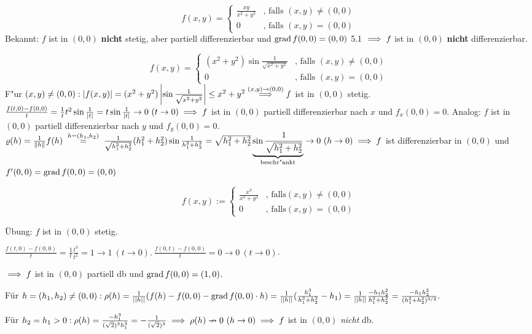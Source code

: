 \documentclass[a4paper,twoside,DIV15,BCOR12mm]{scrbook}
\begin{document}
\begin{beispiele}
\item $$f(x,y)=\begin{cases}
\frac{xy}{x^2+y^2}&\text{, falls } (x,y)\ne(0,0)\\
0&\text{, falls } (x,y)=(0,0)
\end{cases}$$
Bekannt: $f$ ist in $(0,0)$ \textbf{nicht} stetig, aber partiell differenzierbar und $\mathop{\rm grad}\nolimits f(0,0)=(0,0)$ 5.1 $\implies f$ ist in $(0,0)$ \textbf{nicht} differenzierbar.
\item $$f(x,y)=\begin{cases}
(x^2+y^2)\sin\frac{1}{\sqrt{x^2+y^2}}&\text{, falls } (x,y)\ne(0,0)\\
0&\text{, falls }(x,y)=(0,0)
\end{cases}$$
F"ur $(x,y)\ne(0,0): \left|f(x,y)\right|=(x^2+y^2)\left|\sin\frac{1}{\sqrt{x^2+y^2}}\right|\le x^2+y^2\overset{(x,y)\to(0,0)}{\implies}f$ ist in $(0,0)$ stetig. $\frac{f(t,0)-f(0,0)}{t}=\frac{1}{t}t^2\sin\frac{1}{|t|}=t\sin\frac{1}{|t|}\to 0\ (t\to 0)\implies f$ ist in $(0,0)$ partiell differenzierbar nach $x$ und $f_x(0,0)=0$. Analog: $f$ ist in $(0,0)$ partiell differenzierbar nach $y$ und $f_y(0,0)=0$. $\varrho(h)=\frac{1}{\|h\|}f(h)\gleichwegen{h=(h_1,h_2)}\frac{1}{\sqrt{h_1^2+h_2^2}}(h_1^2+h_2^2)\sin\frac{1}{h_1^2+h_2^2}=\sqrt{h_1^2+h_2^2}\underbrace{\sin\frac{1}{\sqrt{h_1^2+h_2^2}}}_{\text{beschr"ankt}}\to 0\ (h\to 0)\folgt f$ ist differenzierbar in $(0,0)$ und $f'(0,0)=\mathop{\rm grad}\nolimits f(0,0)=(0,0)$

\item $$f(x,y) := \begin{cases}
\frac{x^3}{x^2+y^2}&\text{, falls} (x,y) \ne (0,0)\\
0&\text{, falls} (x,y) = (0,0)\end{cases}$$

\"Ubung: $f$ ist in $(0,0)$ stetig.

$\frac{f(t,0) - f(0,0)}{t} = \frac{1}{t} \frac{t^3}{t^2} = 1 \to 1\ (t \to 0).\ \frac{f(0,t) - f(0,0)}{t} = 0 \to 0\ (t \to 0)$.

$\implies f$ ist in $(0,0)$ partiell db und $\mathop{\rm grad}\nolimits f(0,0) = (1,0)$.

Für $h = (h_1,h_2) \ne (0,0): \rho(h) = \frac{1}{||h||}(f(h) - f(0,0) - \mathop{\rm grad}\nolimits f(0,0)\cdot h) = \frac{1}{||h||} (\frac{h_1^3}{h_1^2+h_2^2} - h_1) = \frac{1}{||h||} \frac{-h_1 h_2^2}{h_1^2 + h_2^2} =  \frac{-h_1 h_2^2}{(h_1^2 + h_2^2)^{3/2}}.$

Für $h_2 = h_1 > 0: \rho(h) = \frac{-h_1^3}{(\sqrt{2})^3 h_1^3} = - \frac{1}{(\sqrt{2})^3} \implies \rho(h) \nrightarrow 0\ (h \to 0) \implies f$ ist in $(0,0)$ \emph{nicht} db.
\end{beispiele}
\end{document}
